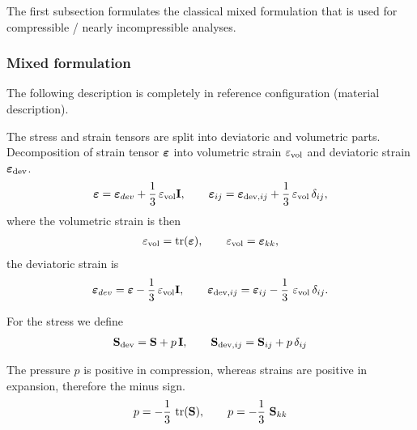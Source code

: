 The first subsection formulates the classical mixed formulation that is used for compressible / nearly incompressible analyses.

\subsubsection{Mixed formulation}

The following description is completely in reference configuration (material description).

The stress and strain tensors are split into deviatoric and volumetric parts.
Decomposition of strain tensor $\boldsymbol{\varepsilon}$ into volumetric strain $\varepsilon_\text{vol}$ and deviatoric strain $\boldsymbol{\varepsilon}_\text{dev}$.
\begin{equation*}
  \begin{array}{lll}
    \boldsymbol{\varepsilon} = \boldsymbol{\varepsilon}_{dev} + \displaystyle\frac{\displaystyle{1}}{\displaystyle{3}}\, \varepsilon_\text{vol}\textbf{I}, \qquad \boldsymbol{\varepsilon}_{ij} = \boldsymbol{\varepsilon}_{\text{dev},ij} + \displaystyle\frac{\displaystyle{1}}{\displaystyle{3}}\,\varepsilon_\text{vol}\,\delta_{ij},
  \end{array}
\end{equation*}
where the volumetric strain is then
\begin{equation*}
  \begin{array}{lll}
    \varepsilon_\text{vol} = \mathrm{tr}(\boldsymbol{\varepsilon}), \qquad \varepsilon_\text{vol} = \boldsymbol{\varepsilon}_{kk},
  \end{array}
\end{equation*}
the deviatoric strain is
\begin{equation*}
  \begin{array}{lll}
    \boldsymbol{\varepsilon}_{dev} = \boldsymbol{\varepsilon} -  \displaystyle\frac{\displaystyle{1}}{\displaystyle{3}}\, \varepsilon_\text{vol}\textbf{I},\qquad   \boldsymbol{\varepsilon}_{\text{dev},ij} = \boldsymbol{\varepsilon}_{ij} - \displaystyle\frac{\displaystyle{1}}{\displaystyle{3}}\,\,\varepsilon_\text{vol}\,\delta_{ij}.
  \end{array}
\end{equation*}

For the stress we define
\begin{equation}\label{eq:sdev_def}
  \begin{array}{lll}
    \textbf{S}_\text{dev} = \textbf{S} + p\,\textbf{I}, \qquad \textbf{S}_{\text{dev},ij} = \textbf{S}_{ij} + p\,\delta_{ij}
  \end{array}
\end{equation}

The pressure $p$ is positive in compression, whereas strains are positive in expansion, therefore the minus sign.
\begin{equation*}
  \begin{array}{lll}
    p = -\displaystyle\frac{\displaystyle{1}}{\displaystyle{3}}\,\,\mathrm{tr}(\textbf{S}), \qquad p = -\displaystyle\frac{\displaystyle{1}}{\displaystyle{3}}\,\,\textbf{S}_{kk}
  \end{array}
\end{equation*}

